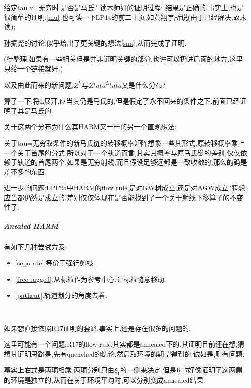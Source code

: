 \begin{que}
							给定tau v=无穷时,是否是马氏?
								读木师姐的证明过程;
									结果是正确的.事实上,也是很简单的证明.\ref{mu}
								也可读一下LP14的前二十页,如黄翔宇所说(由于已经解决,故未读);

							孙振尧的讨论,似乎给出了更关键的想法\ref{sun},从而完成了证明.

								(待整理:如果有一些相关但是并非证明关键的部分,也许可以扔进后面的地方.这里只给一个链接就好.)

								以及由此而来的新问题,$Z^L$与$Ztuta^Ltuta$又是什么分布?

									算了一下,将L展开,应当其仍是马氏的,但是假定了永不回来的条件之下.前面已经证明了其是马氏的.

								关于这两个分布为什么其HARM又一样的另一个直观想法:
								
								关于tau=无穷取条件的新马氏链的转移概率矩阵想象一些其形式,原转移概率乘上一个关于首尾的分式.所以对于一个轨道而言,其实其概率与原马氏链的差别,仅仅依赖于轨道的首尾两个.如果是无穷射线,而且假设足够远都是一致收敛的,那么的确是差不多的东西.

						进一步的问题:LPP95中HARM的flow rule,是对GW树成立,还是对AGW成立?猜想:应当都仍然是成立的.差别仅仅体现在是否能找到了一个关于射线下移算子的不变性了.

								
					\end{que}
	
				\subparagraph*{Anealed HARM}
				\quad

					有如下几种尝试方案:

					\begin{itemize}
						\item \ref{separate},等价于强行剪枝.

						\item \ref{free tagged},从标粒作为参考中心,让标粒随意移动.

						\item \ref{pathcut},轨道划分的角度去看.
					\end{itemize}

					\begin{que}[可能缺乏树的两侧的独立性]
						\label{no indpt}
						\ 

						如果想直接依照R17证明的套路,事实上,还是存在很多的问题的.

						这里可能有一个问题:R17的flow rule.其实都是annealed下的.其证明目前还在想,猜想其证明思路是,先有quenched的结论,然后取环境的期望得到的.诚如是,则有问题.

						事实上右式是两项相乘,两项分别只由$\xi_1$的一侧来决定.但是R17好像证明了这两侧的环境是独立的,从而在关于环境平均时,可以分别变成annealed结果.
					\end{que}

